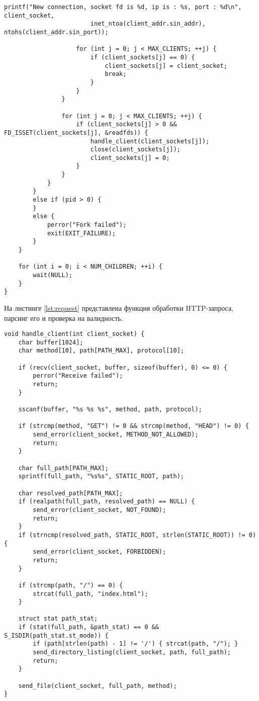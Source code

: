 \documentclass{bmstu}
\begin{document}
\begin{lstlisting}[caption={Механизм prefork + select}, label=lst:server]
                    printf("New connection, socket fd is %d, ip is : %s, port : %d\n", client_socket,
                        inet_ntoa(client_addr.sin_addr), ntohs(client_addr.sin_port));

                    for (int j = 0; j < MAX_CLIENTS; ++j) {
                        if (client_sockets[j] == 0) {
                            client_sockets[j] = client_socket;
                            break;
                        }
                    }
                }

                for (int j = 0; j < MAX_CLIENTS; ++j) {
                    if (client_sockets[j] > 0 && FD_ISSET(client_sockets[j], &readfds)) {
                        handle_client(client_sockets[j]);
                        close(client_sockets[j]);
                        client_sockets[j] = 0;
                    }
                }
            }
        }
        else if (pid > 0) {
        }
        else {
            perror("Fork failed");
            exit(EXIT_FAILURE);
        }
    }

    for (int i = 0; i < NUM_CHILDREN; ++i) {
        wait(NULL);
    }
}
\end{lstlisting}

На листинге \ref{lst:request} представлена функция обработки HTTP-запроса, парсинг его и проверка на валидность.

\begin{lstlisting}[caption={Обработка и парсинг HTTP-запроса}, label=lst:request]
void handle_client(int client_socket) {
    char buffer[1024];
    char method[10], path[PATH_MAX], protocol[10];

    if (recv(client_socket, buffer, sizeof(buffer), 0) <= 0) {
        perror("Receive failed");
        return;
    }

    sscanf(buffer, "%s %s %s", method, path, protocol);

    if (strcmp(method, "GET") != 0 && strcmp(method, "HEAD") != 0) {
        send_error(client_socket, METHOD_NOT_ALLOWED);
        return;
    }

    char full_path[PATH_MAX];
    sprintf(full_path, "%s%s", STATIC_ROOT, path);

    char resolved_path[PATH_MAX];
    if (realpath(full_path, resolved_path) == NULL) {
        send_error(client_socket, NOT_FOUND);
        return;
    }
    if (strncmp(resolved_path, STATIC_ROOT, strlen(STATIC_ROOT)) != 0) {
        send_error(client_socket, FORBIDDEN);
        return;
    }

    if (strcmp(path, "/") == 0) {
        strcat(full_path, "index.html");
    }

    struct stat path_stat;
    if (stat(full_path, &path_stat) == 0 && S_ISDIR(path_stat.st_mode)) {
        if (path[strlen(path) - 1] != '/') { strcat(path, "/"); }
        send_directory_listing(client_socket, path, full_path);
        return;
    }

    send_file(client_socket, full_path, method);
}
\end{lstlisting}
\end{document}
